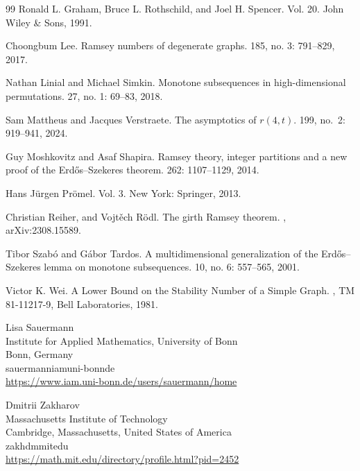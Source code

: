 \documentclass{aic}
\theoremstyle{definition}
\numberwithin{equation}{section}
\numberwithin{figure}{section}
\begin{document}
\begin{thebibliography}{99}
Ronald L. Graham, Bruce L. Rothschild, and Joel H. Spencer. 
 Vol. 20. John Wiley \& Sons, 1991.


Choongbum Lee. 
\newblock Ramsey numbers of degenerate graphs.
 185, no. 3: 791--829, 2017.

Nathan Linial and Michael Simkin. 
\newblock Monotone subsequences in high-dimensional permutations. 
 27, no. 1: 69--83, 2018.

Sam Mattheus and Jacques Verstraete. 
\newblock The asymptotics of $r(4,t)$.
 199, no.~2: 919–941,  2024.


Guy Moshkovitz and Asaf Shapira. 
\newblock Ramsey theory, integer partitions and a new proof of the Erdős–Szekeres theorem. 
 262: 1107--1129, 2014.

Hans Jürgen Prömel. 
 Vol. 3. New York: Springer, 2013.

Christian Reiher, and Vojt\v{e}ch R\"odl. 
\newblock The girth Ramsey theorem.
, arXiv:2308.15589.

Tibor Szab\'{o} and G\'{a}bor Tardos. 
\newblock A multidimensional generalization of the Erd\H{o}s–Szekeres lemma on monotone subsequences.
 10, no. 6: 557--565, 2001.

Victor K. Wei. 
\newblock A Lower Bound on the Stability Number of a Simple Graph.
, TM 81-11217-9, Bell Laboratories, 1981.

\end{thebibliography}

\begin{aicauthors}
\begin{authorinfo}[pgom]
  Lisa Sauermann\\
  Institute for Applied Mathematics, University of Bonn\\
  Bonn, Germany\\
  sauermann\imageat{}iam\imagedot{}uni-bonn\imagedot{}de \\
  \url{https://www.iam.uni-bonn.de/users/sauermann/home}
\end{authorinfo}
\begin{authorinfo}[johan]
  Dmitrii Zakharov\\
  Massachusetts Institute of Technology\\
  Cambridge, Massachusetts, United States of America\\
  zakhdm\imageat{}mit\imagedot{}edu \\
  \url{https://math.mit.edu/directory/profile.html?pid=2452}
\end{authorinfo}

\end{aicauthors}
\end{document}
